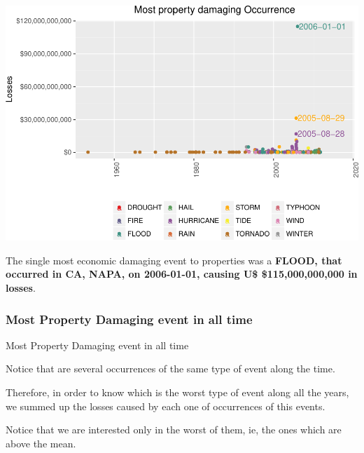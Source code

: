 \documentclass[]{article}
\begin{document}
\includegraphics{readme_files/figure-latex/prop-single-plot-1.pdf}

The single most economic damaging event to properties was a
\textbf{FLOOD, that occurred in CA, NAPA, on 2006-01-01, causing U\$
\$115,000,000,000 in losses}.

\subsubsection{Most Property Damaging event in all
time}\label{most-property-damaging-event-in-all-time}

Most Property Damaging event in all time

Notice that are several occurrences of the same type of event along the
time.

Therefore, in order to know which is the worst type of event along all
the years, we summed up the losses caused by each one of occurrences of
this events.

Notice that we are interested only in the worst of them, ie, the ones
which are above the mean.
\end{document}
